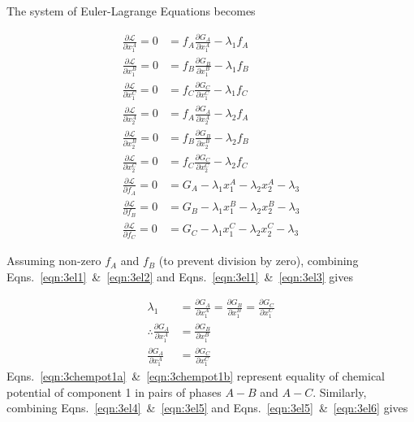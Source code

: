 \documentclass[10pt]{article}
\begin{document}
The system of Euler-Lagrange Equations becomes

\begin{align}
  \label{eqn:3el1}
  \frac{\partial\mathcal{L}}{\partial x_1^A} = 0 &= f_A \frac{\partial G_A}{\partial x_1^A} - \lambda_1 f_A\\
  \label{eqn:3el2}
  \frac{\partial\mathcal{L}}{\partial x_1^B} = 0 &= f_B \frac{\partial G_B}{\partial x_1^B} - \lambda_1 f_B\\
  \label{eqn:3el3}
  \frac{\partial\mathcal{L}}{\partial x_1^C} = 0 &= f_C \frac{\partial G_C}{\partial x_1^C} - \lambda_1 f_C\\
  \label{eqn:3el4}
  \frac{\partial\mathcal{L}}{\partial x_2^A} = 0 &= f_A \frac{\partial G_A}{\partial x_2^A} - \lambda_2 f_A\\
  \label{eqn:3el5}
  \frac{\partial\mathcal{L}}{\partial x_2^B} = 0 &= f_B \frac{\partial G_B}{\partial x_2^B} - \lambda_2 f_B\\
  \label{eqn:3el6}
  \frac{\partial\mathcal{L}}{\partial x_2^C} = 0 &= f_C \frac{\partial G_C}{\partial x_2^C} - \lambda_2 f_C\\
  \label{eqn:3el7}
  \frac{\partial\mathcal{L}}{\partial f_A} = 0 &= G_A - \lambda_1 x_1^A - \lambda_2 x_2^A - \lambda_3\\
  \label{eqn:3el8}
  \frac{\partial\mathcal{L}}{\partial f_B} = 0 &= G_B - \lambda_1 x_1^B - \lambda_2 x_2^B - \lambda_3\\
  \label{eqn:3el9}
  \frac{\partial\mathcal{L}}{\partial f_C} = 0 &= G_C - \lambda_1 x_1^C - \lambda_2 x_2^C - \lambda_3
\end{align}

Assuming non-zero $f_A$ and $f_B$ (to prevent division by zero), combining Eqns.~\ref{eqn:3el1}~\&~\ref{eqn:3el2}
and Eqns.~\ref{eqn:3el1}~\&~\ref{eqn:3el3} gives

\begin{align}
  \lambda_1 &= \frac{\partial G_A}{\partial x_1^A} = \frac{\partial G_B}{\partial x_1^B} = \frac{\partial G_C}{\partial x_1^C}\\
  \label{eqn:3chempot1a}
  \therefore \frac{\partial G_A}{\partial x_1^A} &= \frac{\partial G_B}{\partial x_1^B}\\
  \label{eqn:3chempot1b}
             \frac{\partial G_A}{\partial x_1^A} &= \frac{\partial G_C}{\partial x_1^C}
\end{align}
Eqns.~\ref{eqn:3chempot1a}~\&~\ref{eqn:3chempot1b} represent equality of chemical potential of component 1
in pairs of phases $A-B$ and $A-C$. Similarly, combining Eqns.~\ref{eqn:3el4}~\&~\ref{eqn:3el5}
and Eqns.~\ref{eqn:3el5}~\&~\ref{eqn:3el6} gives
\end{document}
